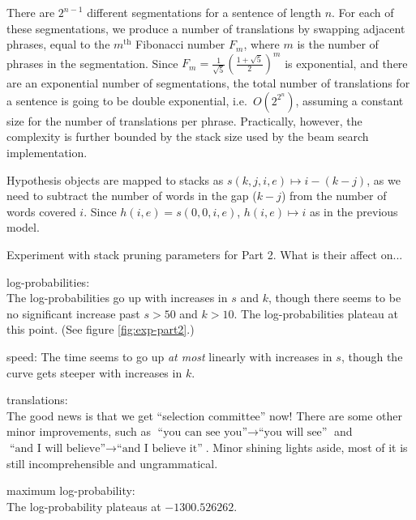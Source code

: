 \documentclass[answers]{exam}
\begin{document}
\begin{questions}
\begin{framed}
  There are $2^{n-1}$ different segmentations for a sentence of length $n$.
  For each of these segmentations, we produce a number of translations by
  swapping adjacent phrases, equal to the $m^{\text{th}}$ Fibonacci number
  $F_m$, where $m$ is the number of phrases in the segmentation.
  Since $F_m = \frac{1}{\sqrt{5}}(\frac{1+\sqrt{5}}{2})^m$ is exponential, and
  there are an exponential number of segmentations, the total number of
  translations for a sentence is going to be double exponential, i.e.\
  $O(2^{2^n})$, assuming a constant size for the number of translations per
  phrase.
  Practically, however, the complexity is further bounded by the stack size used
  by the beam search implementation.
\end{framed}


\begin{framed}
  Hypothesis objects are mapped to stacks as $s(k,j,i,e)\mapsto i - (k - j)$, as
  we need to subtract the number of words in the gap ($k - j$) from the number
  of words covered $i$. Since $h(i,e) = s(0,0,i,e)$, $h(i,e)\mapsto i$ as in
  the previous model.
\end{framed}


\addtocounter{question}{1}
\question[15] Experiment with stack pruning parameters for Part 2. What is their affect on...
\begin{framed}
\begin{compactenum}[a.]
\item log-probabilities:\\
  The log-probabilities go up with increases in $s$ and $k$, though there seems
  to be no significant increase past $s > 50$ and $k > 10$. The
  log-probabilities plateau at this point. (See figure \ref{fig:exp-part2}.) 
\item speed:
  The time seems to go up \emph{at most} linearly with increases in $s$, though
  the curve gets steeper with increases in $k$.
\item translations:\\
  The good news is that we get ``selection committee'' now! There are some other
  minor improvements, such as $\text{``you can see you''}\rightarrow\text{``you
    will see''}$ and $\text{``and I will believe''}\rightarrow\text{``and I
    believe it''}$. Minor shining lights aside, most of it is still
  incomprehensible and ungrammatical.
\item maximum log-probability:\\
  The log-probability plateaus at $-1300.526262$.
\end{compactenum}
\end{framed}



\end{questions}
\end{document}
